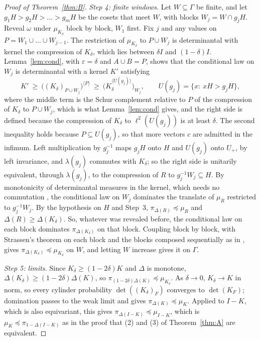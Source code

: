 \documentclass[11pt]{amsart}
\theoremstyle{remark}
\theoremstyle{definition}
\newcommand{\Ga}{\Gamma}
\newcommand{\FK}{\Delta}
\newcommand{\dom}{\preccurlyeq}
\newcommand{\ltwo}{\ell^2}
\begin{document}
\begin{proof}[Proof of Theorem~\ref{thm:B}]
\emph{Step 4: finite windows.} Let $W\subseteq\Ga$ be finite, and let $g_1H>g_2H>\dots>g_mH$ be the cosets that meet
$W$, with blocks $W_j=W\cap g_jH$. Reveal $\omega$ under $\mu_{K_\delta}$ block by block, $W_1$ first. Fix $j$ and any
values on $P=W_1\cup\dots\cup W_{j-1}$. The restriction of $\mu_{K_\delta}$ to $P\cup W_j$ is determinantal with kernel
the compression of $K_\delta$, which lies between $\delta I$ and $(1-\delta)I$. Lemma~\ref{lem:cond}, with
$\varepsilon=\delta$ and $A\cup B=P$, shows that the conditional law on $W_j$ is determinantal with a kernel $K'$ satisfying
\[
K'\ \ge\ \bigl((K_\delta)_{P\cup W_j}\bigr)^{\langle P\rangle}\ \ge\ \bigl(K_\delta^{\langle U(g_j)\rangle}\bigr)_{W_j},
\qquad U(g_j)=\{x:\ xH>g_jH\},
\]
where the middle term is the Schur complement relative to $P$ of the compression of $K_\delta$ to $P\cup W_j$, which is
what Lemma~\ref{lem:cond} gives, and the right side is defined because the compression of $K_\delta$ to
$\ltwo(U(g_j))$ is at least $\delta$. The second inequality holds because $P\subseteq U(g_j)$, so that more vectors $c$ are admitted in the infimum. Left
multiplication by $g_j^{-1}$ maps $g_jH$ onto $H$ and $U(g_j)$ onto $U_+$, by left invariance, and $\lambda(g_j)$
commutes with $K_\delta$; so the right side is unitarily equivalent, through $\lambda(g_j)$, to the compression of $R$
to $g_j^{-1}W_j\subseteq H$. By monotonicity of determinantal measures in the kernel, which needs no commutation
\cite[Thm.~2.9]{LyICM}, the conditional law on $W_j$ dominates the translate of $\mu_R$ restricted to $g_j^{-1}W_j$. By
the hypothesis on $H$ and Step~3, $\pi_{\FK(R)}\dom\mu_R$ and $\FK(R)\ge\FK(K_\delta)$. So, whatever was revealed
before, the conditional law on each block dominates $\pi_{\FK(K_\delta)}$ on that block. Coupling block by block, with
Strassen's theorem \cite{Str65} on each block and the blocks composed sequentially as in \cite[Lemma~5.2]{LS03}, gives $\pi_{\FK(K_\delta)}\dom\mu_{K_\delta}$ on $W$, and letting $W$ increase gives it on $\Ga$.

\emph{Step 5: limits.} Since $K_\delta\ge(1-2\delta)K$ and $\FK$ is monotone, $\FK(K_\delta)\ge(1-2\delta)\FK(K)$, so
$\pi_{(1-2\delta)\FK(K)}\dom\mu_{K_\delta}$. As $\delta\to0$, $K_\delta\to K$ in norm, so every cylinder probability
$\det((K_\delta)_F)$ converges to $\det(K_F)$; domination passes to the weak limit and gives $\pi_{\FK(K)}\dom\mu_K$.
Applied to $I-K$, which is also equivariant, this gives $\pi_{\FK(I-K)}\dom\mu_{I-K}$, which is
$\mu_K\dom\pi_{1-\FK(I-K)}$ as in the proof that (2) and (3) of Theorem~\ref{thm:A} are equivalent.
\end{proof}
\end{document}
